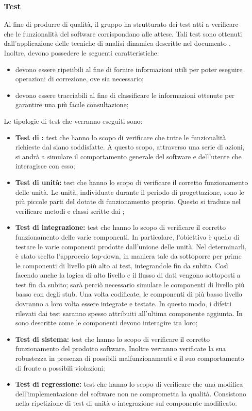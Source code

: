 \documentclass[PdQ.tex]{subfiles}
\begin{document}
\subsubsection{Test}
Al fine di produrre  di qualità, il gruppo ha strutturato dei test atti a verificare che le funzionalità del software  corrispondano alle attese.
Tali test sono ottenuti dall'applicazione delle tecniche di analisi dinamica descritte nel documento \NPdocRP{}. Inoltre, devono possedere le seguenti caratteristiche:
\begin{itemize}
	\item devono essere ripetibili al fine di fornire informazioni utili per poter eseguire operazioni di correzione, ove sia necessario;
	\item devono essere tracciabili al fine di classificare le informazioni ottenute per garantire una più facile consultazione;
\end{itemize}
Le tipologie di test che verranno eseguiti sono:
\begin{itemize}
\item \textbf{Test di :} test che hanno lo scopo di verificare che tutte le funzionalità richieste dal  siano soddisfatte. A questo scopo, attraverso una serie di
azioni, si andrà a simulare il comportamento generale del software e dell'utente che interagisce con esso;
\item \textbf{Test di unità: } test che  hanno lo scopo di verificare il corretto funzionamento delle unità. Le unità, individuate durante il periodo di progettazione, sono le
		più piccole parti del  dotate di funzionamento proprio. Questo si traduce nel verificare metodi e classi scritte dai \PRP{};
\item \textbf{Test di integrazione: } test che hanno lo scopo di verificare il corretto funzionamento delle varie componenti. In particolare, l'obiettivo è quello di testare le varie componenti prodotte dall'unione delle unità. Nel determinarli, è stato scelto l'approccio top-down, in maniera tale da sottoporre per prime le componenti di livello più alto ai test, integrandole fin da subito. Così facendo anche la logica di alto livello e il flusso di dati vengono sottoposti a test fin da subito; sarà perciò necessario simulare le componenti di livello più basso con degli stub. Una volta codificate, le componenti di più basso livello dovranno a loro volta essere
integrate e testate. In questo modo, i difetti rilevati dai test saranno spesso attribuiti all'ultima componente aggiunta. In \DPdoc{} sono descritte come le componenti devono interagire tra loro;
\item \textbf{Test di sistema: }test che hanno lo scopo di verificare il corretto funzionamento del prodotto software. Inoltre verranno verificate la sua robustezza in presenza di
		possibili malfunzionamenti e il suo comportamento di fronte a possibili violazioni;
\item \textbf{Test di regressione: } test che hanno lo scopo di verificare che una modifica dell'implementazione del software non ne comprometta la qualità. Consistono nella ripetizione di test di unità o integrazione sul componente modificato.
\end{itemize}
\end{document}
